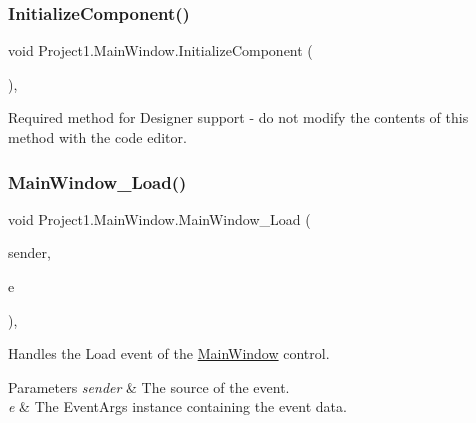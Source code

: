 \subsubsection{\texorpdfstring{Initialize\+Component()}{InitializeComponent()}}
{\footnotesize\ttfamily void Project1.\+Main\+Window.\+Initialize\+Component (\begin{DoxyParamCaption}{ }\end{DoxyParamCaption})\hspace{0.3cm}{\ttfamily [inline]}, {\ttfamily [private]}}



Required method for Designer support -\/ do not modify the contents of this method with the code editor. 

\mbox{\label{classProject1_1_1MainWindow_a31c174049fa92aa29587cf81f7749bd3}} 
\subsubsection{\texorpdfstring{Main\+Window\+\_\+\+Load()}{MainWindow\_Load()}}
{\footnotesize\ttfamily void Project1.\+Main\+Window.\+Main\+Window\+\_\+\+Load (\begin{DoxyParamCaption}\item[{object}]{sender,  }\item[{Event\+Args}]{e }\end{DoxyParamCaption})\hspace{0.3cm}{\ttfamily [inline]}, {\ttfamily [private]}}



Handles the Load event of the \hyperlink{classProject1_1_1MainWindow}{Main\+Window} control. 


\begin{DoxyParams}{Parameters}
{\em sender} & The source of the event.\\
\hline
{\em e} & The Event\+Args instance containing the event data.\\
\hline
\end{DoxyParams}
\mbox{\label{classProject1_1_1MainWindow_af3d1ecd028cb95773e1c1eec3a28e7ce}} 
